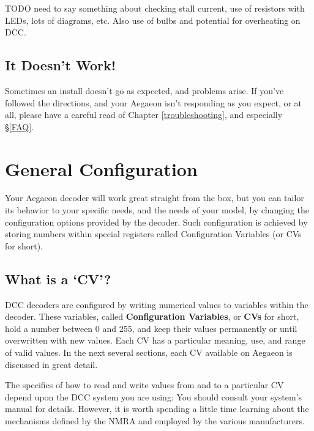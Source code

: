\documentclass[12pt,letterpaper,draft]{memoir} %
\begin{document}
TODO need to say something about checking stall current, use of resistors with LEDs, lots of diagrams, etc. Also use of bulbs and potential for overheating on DCC.

\section{It Doesn't Work!}

Sometimes an install doesn't go as expected, and problems arise. If you've followed the directions, and your Aegaeon isn't responding as you expect, or at all, please have a careful read of Chapter \ref{troubleshooting}, and especially \S\ref{FAQ}.

\chapter{General Configuration}
\label{generalconfiguration}
Your Aegaeon decoder will work great straight from the box, but you can tailor its behavior to your specific needs, and the needs of your model, by changing the configuration options provided by the decoder. Such configuration is achieved by storing numbers within special registers called Configuration Variables (or CVs for short).

\section{What is a `CV'?}
\label{WhatIsACV}
DCC decoders are configured by writing numerical values to variables within the decoder. These variables, called \textbf{Configuration Variables}, or \textbf{CVs} for short, hold a number between 0 and 255, and keep their values permanently or until overwritten with new values. Each CV has a particular meaning, use, and range of valid values. In the next several sections, each CV available on Aegaeon is discussed in great detail.

The specifics of how to read and write values from and to a particular CV depend upon the DCC system you are using: You should consult your system's manual for details. However, it is worth spending a little time learning about the mechanisms defined by the NMRA and employed by the various manufacturers.
\end{document}
